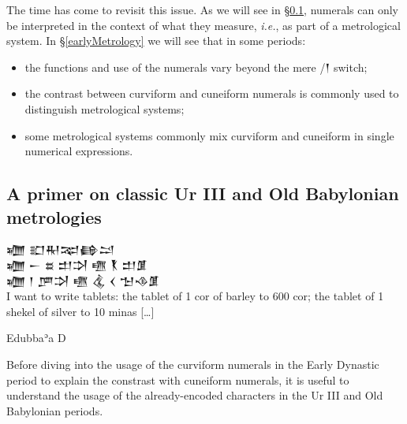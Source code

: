 \documentclass[10pt, a4paper, twoside]{article}
\newcommand\oneAšC{{\proposalfont\symbol{"12550}}} %
\newcommand{\idest}{\emph{i.e.}}
\renewcommand{\epigraphsize}{\footnotesize}
\begin{document}
The time has come to revisit this issue.
As we will see in §\ref{metrology},
numerals can only be interpreted in the context of what they measure, \idest,
as part of a metrological system.
In §\ref{earlyMetrology} we will see that in some periods:
\begin{itemize}[nosep]
  \item the functions and use of the numerals vary beyond the mere \oneAšC/{\xsuxfont 𒁹} switch;
  \item the contrast between curviform and cuneiform numerals is commonly used to distinguish metrological systems;
  \item some metrological systems commonly mix curviform and cuneiform in single numerical expressions.
\end{itemize}

\subsection{A primer on classic Ur III and Old Babylonian metrologies}
\label{metrology}
{\settowidth{\epigraphwidth}{\epigraphsize\obfont 𒁾 𒁹 𒂆𒋫 𒍠 𒆬 𒌋 𒈠𒈾𒂠 \hspace{1.5em}}
\epigraph{
{\obfont 𒁾 𒊬𒊑𒉈\hfill 𒂵𒁺} \\
{\obfont 𒁾 𒀸 𒊺 𒄥𒋫 𒍠 \hfill {\nafont 𒐞} 𒄥𒂠} \\
{\obfont 𒁾 𒁹 𒂆𒋫 𒍠 \hfill 𒆬 \hfill 𒌋 𒈠𒈾𒂠} \\
I want to write tablets: the tablet of 1 cor of barley to
600 cor; the tablet of 1 shekel of silver to 10 minas […]}{Edubbaʾa D\footnotemark}}%
%

Before diving into the usage of the curviform numerals
in the Early Dynastic period to explain the constrast
with cuneiform numerals, it is useful to understand
the usage of the already-encoded characters in the
Ur III and Old Babylonian periods.
\end{document}
